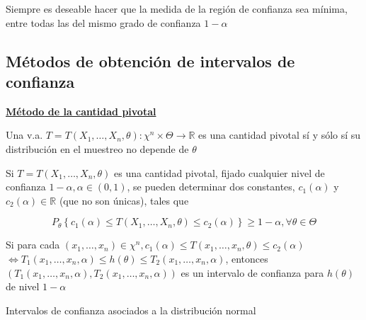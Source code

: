 \begin{observación}
Siempre es deseable hacer que la medida de la región de confianza sea mínima, entre todas las del mismo grado de confianza $1-\alpha$
\end{observación}

\subsection{Métodos de obtención de intervalos de confianza}
\underline{\textbf{Método de la cantidad pivotal}}\\
\begin{definición}
    Una v.a. $T=T\left(X_{1}, \ldots, X_{n}, \theta\right): \chi^{n} \times \Theta
    \rightarrow \mathbb{R}$ es una cantidad pivotal sí y sólo sí su distribución en
    el muestreo no depende de $\theta$
\end{definición}


Si $T=T\left(X_{1}, \ldots, X_{n}, \theta\right)$ es una cantidad pivotal,
fijado cualquier nivel de confianza $1-\alpha, \alpha \in(0,1)$, se pueden
determinar dos constantes, $c_{1}(\alpha)$ y $c_{2}(\alpha) \in \mathbb{R}$
(que no son únicas), tales que

$$
    P_{\theta}\left\{c_{1}(\alpha) \leq T\left(X_{1}, \ldots, X_{n}, \theta\right) \leq c_{2}(\alpha)\right\} \geq 1-\alpha, \forall \theta \in \Theta
$$

Si para cada $\left(x_{1}, \ldots, x_{n}\right) \in \chi^{n}, c_{1}(\alpha)
    \leq T\left(x_{1}, \ldots, x_{n}, \theta\right) \leq c_{2}(\alpha)$
$\Leftrightarrow T_{1}\left(x_{1}, \ldots, x_{n}, \alpha\right) \leq h(\theta)
    \leq T_{2}\left(x_{1}, \ldots, x_{n}, \alpha\right)$, entonces
$\left(T_{1}\left(x_{1}, \ldots, x_{n}, \alpha\right), T_{2}\left(x_{1},
    \ldots, x_{n}, \alpha\right)\right)$ es un intervalo de confianza para
$h(\theta)$ de nivel $1-\alpha$

Intervalos de confianza asociados a la distribución normal\\


